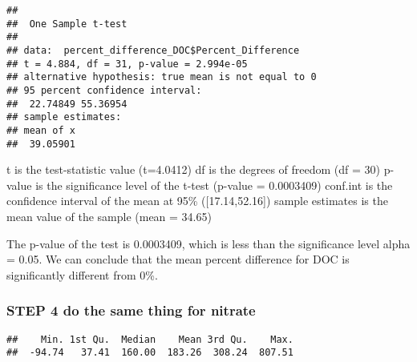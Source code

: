 \documentclass[
]{article}
\newenvironment{Shaded}{\begin{snugshade}}{\end{snugshade}}
\newcommand{\AlertTok}[1]{\textcolor[rgb]{0.94,0.16,0.16}{#1}}
\newcommand{\AttributeTok}[1]{\textcolor[rgb]{0.77,0.63,0.00}{#1}}
\newcommand{\CommentTok}[1]{\textcolor[rgb]{0.56,0.35,0.01}{\textit{#1}}}
\newcommand{\ConstantTok}[1]{\textcolor[rgb]{0.00,0.00,0.00}{#1}}
\newcommand{\DocumentationTok}[1]{\textcolor[rgb]{0.56,0.35,0.01}{\textbf{\textit{#1}}}}
\newcommand{\FunctionTok}[1]{\textcolor[rgb]{0.00,0.00,0.00}{#1}}
\newcommand{\NormalTok}[1]{#1}
\newcommand{\SpecialCharTok}[1]{\textcolor[rgb]{0.00,0.00,0.00}{#1}}
\newcommand{\StringTok}[1]{\textcolor[rgb]{0.31,0.60,0.02}{#1}}
\begin{document}
\begin{verbatim}
## 
##  One Sample t-test
## 
## data:  percent_difference_DOC$Percent_Difference
## t = 4.884, df = 31, p-value = 2.994e-05
## alternative hypothesis: true mean is not equal to 0
## 95 percent confidence interval:
##  22.74849 55.36954
## sample estimates:
## mean of x 
##  39.05901
\end{verbatim}

t is the test-statistic value (t=4.0412) df is the degrees of freedom
(df = 30) p-value is the significance level of the t-test (p-value =
0.0003409) conf.int is the confidence interval of the mean at 95\%
({[}17.14,52.16{]}) sample estimates is the mean value of the sample
(mean = 34.65)

The p-value of the test is 0.0003409, which is less than the
significance level alpha = 0.05. We can conclude that the mean percent
difference for DOC is significantly different from 0\%.

\hypertarget{step-4-do-the-same-thing-for-nitrate}{%
\subsubsection{STEP 4 do the same thing for
nitrate}\label{step-4-do-the-same-thing-for-nitrate}}

\begin{Shaded}
\end{Shaded}

\begin{verbatim}
##    Min. 1st Qu.  Median    Mean 3rd Qu.    Max. 
##  -94.74   37.41  160.00  183.26  308.24  807.51
\end{verbatim}

\begin{Shaded}
\end{Shaded}
\end{document}
